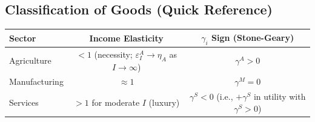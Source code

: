 \documentclass[a4paper,11pt]{article}
\begin{document}
\subsection*{Classification of Goods (Quick Reference)}

\begin{center}
\begin{tabular}{lcc}
\toprule
\textbf{Sector} & \textbf{Income Elasticity} & \textbf{$\gamma_i$ Sign (Stone-Geary)} \\
\midrule
Agriculture & $<1$ (necessity; $\varepsilon_I^A \to \eta_A$ as $I \to \infty$) & $\gamma^A > 0$ \\
Manufacturing & $\approx 1$ & $\gamma^M = 0$ \\
Services & $>1$ for moderate $I$ (luxury) & $\gamma^S < 0$ (i.e., $+\gamma^S$ in utility with $\gamma^S > 0$) \\
\bottomrule
\end{tabular}
\end{center}
\end{document}

